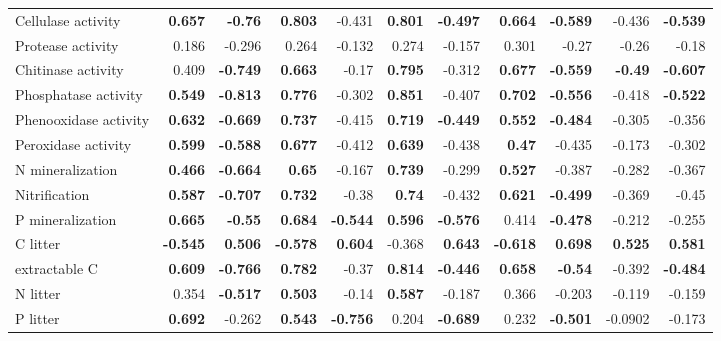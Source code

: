 \documentclass[10pt]{article}
\begin{document}
\begin{flushleft}
\begin{landscape}
\begin{table}[h!]
\begin{center}
{\begin{tabular}{lrrrrrrrrrr}
  Cellulase activity & \textbf{ 0.657 } & \textbf{ -0.76 } & \textbf{ 0.803 } & -0.431 & \textbf{ 0.801 } & \textbf{ -0.497 } & \textbf{ 0.664 } & \textbf{ -0.589 } & -0.436 & \textbf{ -0.539 } \\ 
  Protease activity & 0.186 & -0.296 & 0.264 & -0.132 & 0.274 & -0.157 & 0.301 & -0.27 & -0.26 & -0.18 \\ 
  Chitinase activity & 0.409 & \textbf{ -0.749 } & \textbf{ 0.663 } & -0.17 & \textbf{ 0.795 } & -0.312 & \textbf{ 0.677 } & \textbf{ -0.559 } & \textbf{ -0.49 } & \textbf{ -0.607 } \\ 
  Phosphatase activity & \textbf{ 0.549 } & \textbf{ -0.813 } & \textbf{ 0.776 } & -0.302 & \textbf{ 0.851 } & -0.407 & \textbf{ 0.702 } & \textbf{ -0.556 } & -0.418 & \textbf{ -0.522 } \\ 
  Phenooxidase activity & \textbf{ 0.632 } & \textbf{ -0.669 } & \textbf{ 0.737 } & -0.415 & \textbf{ 0.719 } & \textbf{ -0.449 } & \textbf{ 0.552 } & \textbf{ -0.484 } & -0.305 & -0.356 \\ 
  Peroxidase activity & \textbf{ 0.599 } & \textbf{ -0.588 } & \textbf{ 0.677 } & -0.412 & \textbf{ 0.639 } & -0.438 & \textbf{ 0.47 } & -0.435 & -0.173 & -0.302 \\ 
  N mineralization & \textbf{ 0.466 } & \textbf{ -0.664 } & \textbf{ 0.65 } & -0.167 & \textbf{ 0.739 } & -0.299 & \textbf{ 0.527 } & -0.387 & -0.282 & -0.367 \\ 
  Nitrification & \textbf{ 0.587 } & \textbf{ -0.707 } & \textbf{ 0.732 } & -0.38 & \textbf{ 0.74 } & -0.432 & \textbf{ 0.621 } & \textbf{ -0.499 } & -0.369 & -0.45 \\ 
  P mineralization & \textbf{ 0.665 } & \textbf{ -0.55 } & \textbf{ 0.684 } & \textbf{ -0.544 } & \textbf{ 0.596 } & \textbf{ -0.576 } & 0.414 & \textbf{ -0.478 } & -0.212 & -0.255 \\ 
  C litter & \textbf{ -0.545 } & \textbf{ 0.506 } & \textbf{ -0.578 } & \textbf{ 0.604 } & -0.368 & \textbf{ 0.643 } & \textbf{ -0.618 } & \textbf{ 0.698 } & \textbf{ 0.525 } & \textbf{ 0.581 } \\ 
  extractable C & \textbf{ 0.609 } & \textbf{ -0.766 } & \textbf{ 0.782 } & -0.37 & \textbf{ 0.814 } & \textbf{ -0.446 } & \textbf{ 0.658 } & \textbf{ -0.54 } & -0.392 & \textbf{ -0.484 } \\ 
  N litter & 0.354 & \textbf{ -0.517 } & \textbf{ 0.503 } & -0.14 & \textbf{ 0.587 } & -0.187 & 0.366 & -0.203 & -0.119 & -0.159 \\ 
  P litter & \textbf{ 0.692 } & -0.262 & \textbf{ 0.543 } & \textbf{ -0.756 } & 0.204 & \textbf{ -0.689 } & 0.232 & \textbf{ -0.501 } & -0.0902 & -0.173 \\ 

\end{tabular}}
\end{center}
\end{table}
\end{landscape}
\end{flushleft}
\end{document}
